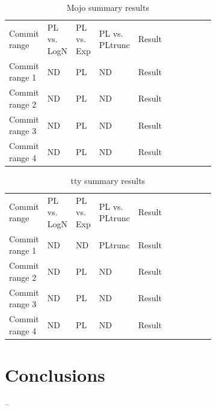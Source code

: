 \documentclass[conference]{IEEEtran}
\begin{document}
\begin{table}[h!tbp]
	\caption{Mojo summary results}
	\begin{center}
		\begin{tabular}{| p{0.12\linewidth} | p{0.08\linewidth} | p{0.08\linewidth} | p{0.08\linewidth} | p{0.1\linewidth} |p{0.13\linewidth} | p{0.09\linewidth} |}
			\hline
                  Commit range & PL vs. LogN & PL vs. Exp & PL vs. PLtrunc & Result \\
                  Commit range 1 &  ND & PL  & ND & Result \\
                  Commit range 2& ND & PL  & ND & Result \\
                  Commit range 3& ND  &  PL & ND & Result \\
                  Commit range 4& ND & PL  & ND & Result \\
			\hline

			\hline
		\end{tabular}
	\end{center}
\label{tab:2019testsmojo}
\end{table}


\begin{table}[h!tbp]
	\caption{tty summary results}
	\begin{center}
		\begin{tabular}{| p{0.12\linewidth} | p{0.08\linewidth} | p{0.08\linewidth} | p{0.08\linewidth} | p{0.1\linewidth} |p{0.13\linewidth} | p{0.09\linewidth} |}
			\hline
                  Commit range & PL vs. LogN & PL vs. Exp & PL vs. PLtrunc & Result \\
                  Commit range 1 & ND & ND  & PLtrunc & Result \\
                  Commit range 2& ND & PL  & ND & Result \\
                  Commit range 3& ND  &  PL & ND & Result \\
                  Commit range 4& ND & PL  & ND & Result \\
			\hline

			\hline
		\end{tabular}
	\end{center}
\label{tab:2019teststty}
\end{table}




\section{Conclusions}\label{conc}
--

 
\end{document}

